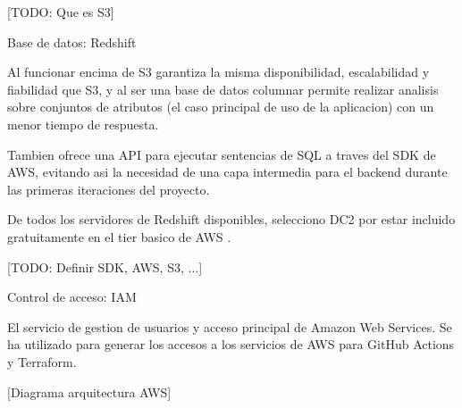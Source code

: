 [TODO: Que es S3]

Base de datos: Redshift

Al funcionar encima de S3 garantiza la misma disponibilidad, escalabilidad y fiabilidad que S3, y al ser una base de datos columnar permite realizar analisis sobre conjuntos de atributos (el caso principal de uso de la aplicacion) con un menor tiempo de respuesta.

Tambien ofrece una API para ejecutar sentencias de SQL a traves del SDK de AWS, evitando asi la necesidad de una capa intermedia para el backend durante las primeras iteraciones del proyecto.

De todos los servidores de Redshift disponibles, selecciono DC2 por estar incluido gratuitamente en el tier basico de AWS \cite{RedshiftPricing}.

[TODO: Definir SDK, AWS, S3, ...]

Control de acceso: IAM

El servicio de gestion de usuarios y acceso principal de Amazon Web Services. Se ha utilizado para generar los accesos a los servicios de AWS para GitHub Actions y Terraform.

[Diagrama arquitectura AWS]
